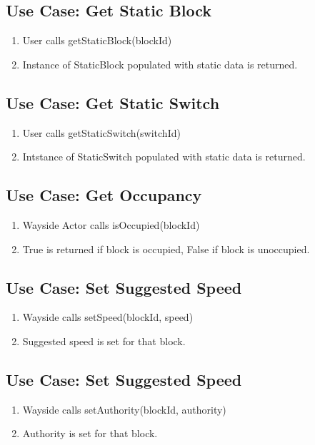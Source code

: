 \documentclass{scrreprt}
\begin{document}
\subsection{Use Case: Get Static Block}
\begin{enumerate}
	\item User calls getStaticBlock(blockId)
	\item Instance of StaticBlock populated with static data is returned.
\end{enumerate}

\subsection{Use Case: Get Static Switch}
\begin{enumerate}
	\item User calls getStaticSwitch(switchId)
	\item Intstance of StaticSwitch populated with static data is returned.
\end{enumerate}

\subsection{Use Case: Get Occupancy}
\begin{enumerate}
	\item Wayside Actor calls isOccupied(blockId)
	\item True is returned if block is occupied, False if block is unoccupied.
\end{enumerate}

\subsection{Use Case: Set Suggested Speed}
\begin{enumerate}
	\item Wayside calls setSpeed(blockId, speed)
	\item Suggested speed is set for that block.
\end{enumerate}

\subsection{Use Case: Set Suggested Speed}
\begin{enumerate}
	\item Wayside calls setAuthority(blockId, authority)
	\item Authority is set for that block.
\end{enumerate}
\end{document}
